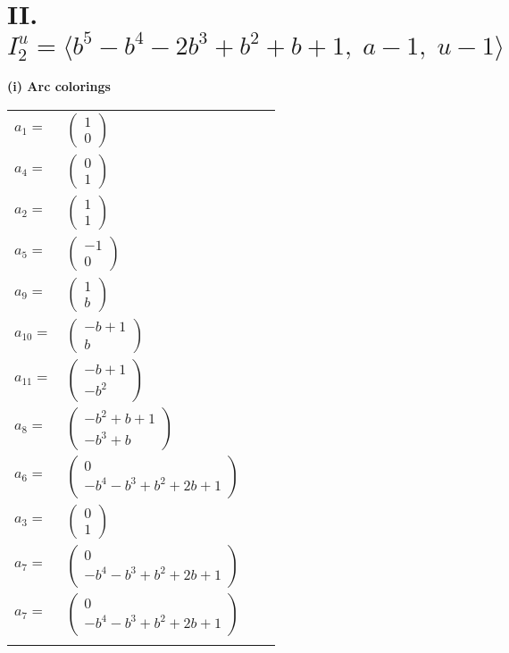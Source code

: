 \documentclass[1p]{elsarticle_modified}
\theoremstyle{definition}
\begin{document}
\centering \section*{II. $I^u_{2}= \langle b^5- b^4-2 b^3+b^2+b+1,\;a-1,\;u-1 \rangle$}
\flushleft \textbf{(i) Arc colorings}\\
\begin{tabular}{m{7pt} m{180pt} m{7pt} m{180pt} }
\flushright $a_{1}=$&$\begin{pmatrix}1\\0\end{pmatrix}$ \\
\flushright $a_{4}=$&$\begin{pmatrix}0\\1\end{pmatrix}$ \\
\flushright $a_{2}=$&$\begin{pmatrix}1\\1\end{pmatrix}$ \\
\flushright $a_{5}=$&$\begin{pmatrix}-1\\0\end{pmatrix}$ \\
\flushright $a_{9}=$&$\begin{pmatrix}1\\b\end{pmatrix}$ \\
\flushright $a_{10}=$&$\begin{pmatrix}- b+1\\b\end{pmatrix}$ \\
\flushright $a_{11}=$&$\begin{pmatrix}- b+1\\- b^2\end{pmatrix}$ \\
\flushright $a_{8}=$&$\begin{pmatrix}- b^2+b+1\\- b^3+b\end{pmatrix}$ \\
\flushright $a_{6}=$&$\begin{pmatrix}0\\- b^4- b^3+b^2+2 b+1\end{pmatrix}$ \\
\flushright $a_{3}=$&$\begin{pmatrix}0\\1\end{pmatrix}$ \\
\flushright $a_{7}=$&$\begin{pmatrix}0\\- b^4- b^3+b^2+2 b+1\end{pmatrix}$\\ \flushright $a_{7}=$&$\begin{pmatrix}0\\- b^4- b^3+b^2+2 b+1\end{pmatrix}$\\&\end{tabular}
\end{document}
